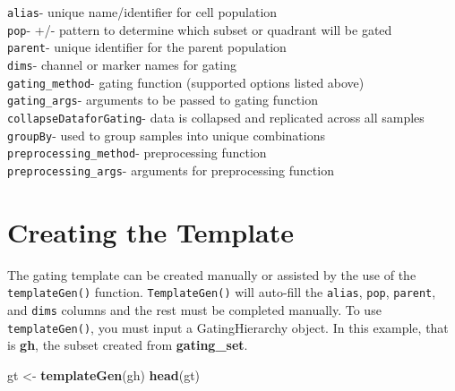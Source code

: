 \documentclass[]{book}
\newenvironment{Shaded}{\begin{snugshade}}{\end{snugshade}}
\newcommand{\KeywordTok}[1]{\textcolor[rgb]{0.13,0.29,0.53}{\textbf{#1}}}
\newcommand{\NormalTok}[1]{#1}
\newcommand{\StringTok}[1]{\textcolor[rgb]{0.31,0.60,0.02}{#1}}
\begin{document}
\texttt{alias}- unique name/identifier for cell population\\
\texttt{pop}- +/- pattern to determine which subset or quadrant will be gated\\
\texttt{parent}- unique identifier for the parent population\\
\texttt{dims}- channel or marker names for gating\\
\texttt{gating\_method}- gating function (supported options listed above)\\
\texttt{gating\_args}- arguments to be passed to gating function
\texttt{collapseDataforGating}- data is collapsed and replicated across all samples\\
\texttt{groupBy}- used to group samples into unique combinations\\
\texttt{preprocessing\_method}- preprocessing function\\
\texttt{preprocessing\_args}- arguments for preprocessing function

\hypertarget{creating-the-template}{%
\section{Creating the Template}\label{creating-the-template}}

The gating template can be created manually or assisted by the use of the \texttt{templateGen()} function. \texttt{TemplateGen()} will auto-fill the \texttt{alias}, \texttt{pop}, \texttt{parent}, and \texttt{dims} columns and the rest must be completed manually. To use \texttt{templateGen()}, you must input a GatingHierarchy object. In this example, that is \textbf{gh}, the subset created from \textbf{gating\_set}.

\begin{Shaded}
\begin{Highlighting}[]
\NormalTok{gt <-}\StringTok{ }\KeywordTok{templateGen}\NormalTok{(gh)}
\KeywordTok{head}\NormalTok{(gt)}
\end{Highlighting}
\end{Shaded}
\end{document}
